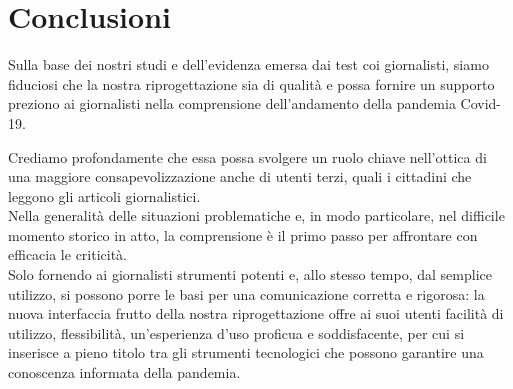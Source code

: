 \documentclass[../../main.tex]{subfiles}
\begin{document}
\section{Conclusioni}
Sulla base dei nostri studi e dell'evidenza emersa dai test coi giornalisti, siamo fiduciosi che la nostra riprogettazione sia di qualità e possa fornire un supporto preziono ai giornalisti nella comprensione dell'andamento della pandemia Covid-19.

Crediamo profondamente che essa possa svolgere un ruolo chiave nell'ottica di una maggiore consapevolizzazione anche di utenti terzi, quali i cittadini che leggono gli articoli giornalistici.\\
Nella generalità delle situazioni problematiche e, in modo particolare, nel difficile momento storico in atto, la comprensione è il primo passo per affrontare con efficacia le criticità.\\
Solo fornendo ai giornalisti strumenti potenti e, allo stesso tempo, dal semplice utilizzo, si possono porre le basi per una comunicazione corretta e rigorosa: la nuova interfaccia frutto della nostra riprogettazione offre ai suoi utenti facilità di utilizzo, flessibilità, un'esperienza d'uso proficua e soddisfacente, per cui si inserisce a pieno titolo tra gli strumenti tecnologici che possono garantire una conoscenza informata della pandemia.
\end{document}
